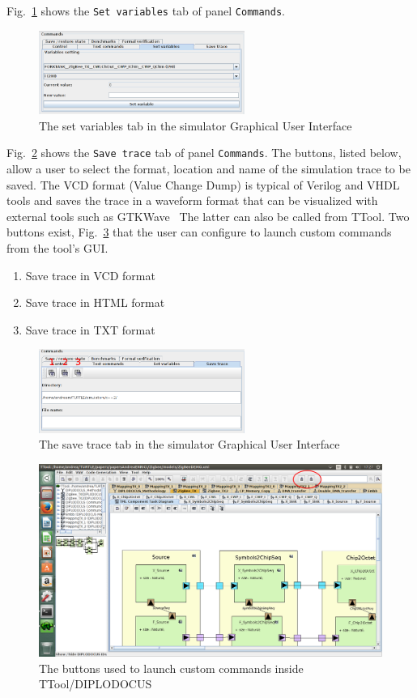\documentclass{llncs}
\newcommand{\screenshotsize}{1.0\textwidth}
\begin{document}
%
Fig.~\ref{fig:CmdSetVariables} shows the \texttt{Set variables} tab of panel \texttt{Commands}.
%
\begin{figure}[!htbp]
	\centering
	\includegraphics[width=0.6\textwidth]{figures/screenshot/CmdSetVariables.png}
	\caption{The set variables tab in the simulator Graphical User Interface}
	\label{fig:CmdSetVariables}
\end{figure}
%
Fig.~\ref{fig:CmdSaveTrace} shows the \texttt{Save trace} tab of panel \texttt{Commands}. The buttons, listed below,
allow a user to select the format, location and name of the simulation trace to be saved. The VCD format (Value Change
Dump) is typical of Verilog and VHDL tools and saves the trace in a waveform format that can be visualized with external
tools such as GTKWave~\cite{gtkwave} The latter can also be called from TTool. Two buttons exist,
Fig.~\ref{fig:CustomButtons} that the user can configure to launch custom commands from the tool's GUI.
%
\begin{enumerate}
	\item Save trace in VCD format
	\item Save trace in HTML format
	\item Save trace in TXT format
\end{enumerate}
%
\begin{figure}[!htbp]
	\centering
	\includegraphics[width=0.6\textwidth]{figures/screenshot/CmdSaveTrace.png}
	\caption{The save trace tab in the simulator Graphical User Interface}
	\label{fig:CmdSaveTrace}
\end{figure}
%
\begin{figure}[!htbp]
	\centering
	\includegraphics[width=\screenshotsize]{figures/screenshot/CustomButtons.png}
	\caption{The buttons used to launch custom commands inside TTool/DIPLODOCUS}
	\label{fig:CustomButtons}
\end{figure}
\end{document}
